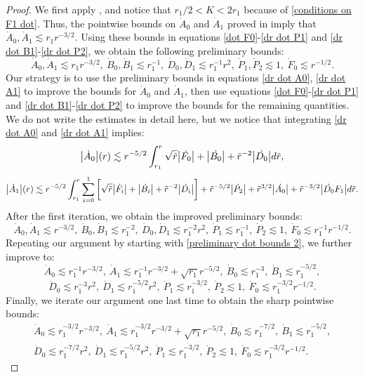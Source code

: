 \documentclass[11pt]{article}
\numberwithin{equation}{section}
\begin{document}
\begin{proof}
    We first apply , and notice that $r_1/2<K<2r_1$ because of \eqref{conditions on F1 dot}. Thus, the pointwise bounds on $\dot{A}_0$ and $\dot{A}_1$ proved in  imply that $\dot{A}_0,\dot{A}_1\lesssim r_1r^{-3/2}.$ Using these bounds in equations \eqref{dot F0}-\eqref{dr dot P1} and \eqref{dr dot B1}-\eqref{dr dot P2}, we obtain the following preliminary bounds:
    \begin{equation}\label{preliminary dot bounds 1}
        \dot{A}_0,\dot{A}_1\lesssim r_1r^{-3/2},\ \dot{B}_0,\dot{B}_1\lesssim r_1^{-1},\ \dot{D}_0,\dot{D}_1\lesssim r_1^{-1}r^2,\ \dot{P}_1,\dot{P}_2\lesssim1,\ \dot{F}_0\lesssim r^{-1/2}.
    \end{equation}
    Our strategy is to use the preliminary bounds in equations \eqref{dr dot A0}, \eqref{dr dot A1} to improve the bounds for $\dot{A}_0$ and $\dot{A}_1$, then use equations \eqref{dot F0}-\eqref{dr dot P1} and \eqref{dr dot B1}-\eqref{dr dot P2} to improve the bounds for the remaining quantities. We do not write the estimates in detail here, but we notice that integrating \eqref{dr dot A0} and \eqref{dr dot A1} implies:
    \[\big|\dot{A}_0\big|(r)\lesssim r^{-5/2}\int_{r_1}^r\sqrt{\Tilde{r}}\big|\dot{F_0}\big|+\big|\dot{B_0}\big|+\Tilde{r}^{-2}\big|\dot{D_0}\big|d\Tilde{r},\]
    \[\big|\dot{A}_1\big|(r)\lesssim r^{-5/2}\int_{r_1}^r\sum_{i=0}^1\bigg[\sqrt{\Tilde{r}}\big|\dot{F_i}\big|+\big|\dot{B_i}\big|+\Tilde{r}^{-2}\big|\dot{D_i}\big|\bigg]+\Tilde{r}^{-5/2}\big|\dot{P_2}\big|+\Tilde{r}^{3/2}\big|\dot{A_0}\big|+\Tilde{r}^{-3/2}\big|\dot{D_0} F_1\big|d\Tilde{r}.\]
    After the first iteration, we obtain the improved preliminary bounds:
    \begin{equation}\label{preliminary dot bounds 2}
        \dot{A}_0,\dot{A}_1\lesssim r^{-3/2},\ \dot{B}_0,\dot{B}_1\lesssim r_1^{-2},\ \dot{D}_0,\dot{D}_1\lesssim r_1^{-2}r^2,\ \dot{P}_1\lesssim r_1^{-1},\ \dot{P}_2\lesssim 1,\ \dot{F}_0\lesssim r_1^{-1}r^{-1/2}.
    \end{equation}
    Repeating our argument by starting with \eqref{preliminary dot bounds 2}, we further improve to: 
    \[\dot{A}_0\lesssim r_1^{-1}r^{-3/2},\ \dot{A}_1\lesssim r_1^{-1}r^{-3/2}+\sqrt{r_1}r^{-5/2},\ \dot{B}_0\lesssim r_1^{-3},\ \dot{B}_1\lesssim r_1^{-5/2},\] \[\dot{D}_0\lesssim r_1^{-3}r^2,\ \dot{D}_1\lesssim r_1^{-5/2}r^2,\ \dot{P}_1\lesssim r_1^{-3/2},\ \dot{P}_2\lesssim1,\ \dot{F}_0\lesssim r_1^{-3/2}r^{-1/2}.\]
    Finally, we iterate our argument one last time to obtain the sharp pointwise bounds:
    \begin{align}
        \dot{A}_0\lesssim r_1^{-3/2}r^{-3/2},\ \dot{A}_1\lesssim r_1^{-3/2}r^{-3/2}+\sqrt{r_1}r^{-5/2},\ \dot{B}_0\lesssim r_1^{-7/2},\ \dot{B}_1\lesssim r_1^{-5/2},\label{sharp dot bounds 1}\\
        \dot{D}_0\lesssim r_1^{-7/2}r^2,\ \dot{D}_1\lesssim r_1^{-5/2}r^2,\ \dot{P}_1\lesssim r_1^{-3/2},\ \dot{P}_2\lesssim1,\ \dot{F}_0\lesssim r_1^{-3/2}r^{-1/2}.\label{sharp dot bounds 2}
    \end{align}


\end{proof}
\end{document}
